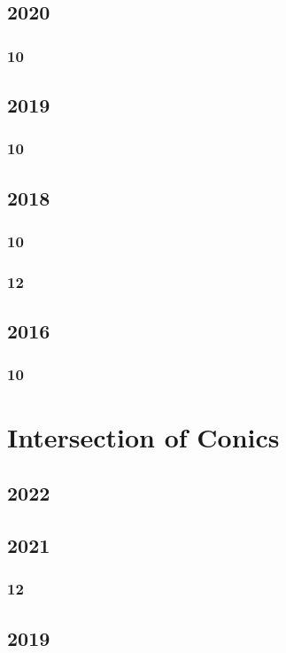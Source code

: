 \documentclass[11pt]{book}
\begin{document}
\section{2020}
\subsection{10}

\section{2019} 
\subsection{10}

\section{2018} 
\subsection{10}

\subsection{12}

\section{2016}
\subsection{10}





\chapter{Intersection of Conics}
\section{2022}

\section{2021}
\subsection{12}

\section{2019}
\end{document}
